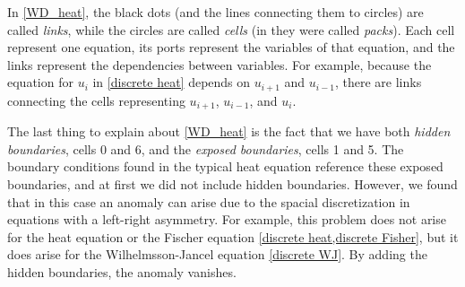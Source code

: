 \documentclass[11pt]{article}
\begin{document}
\begin{figure*}
\caption{Wiring diagram for the discrete heat equation with n = 7 partitions. The boundary conditions in this instance are cells 1 and 5, but the product is evaluated as if 0 and 6 were boundaries to help prevent discontinuities at the true boundary.}
\label{WD_heat}
\begin{center}
\end{center}
\end{figure*}

In \cref{WD_heat}, the black dots (and the lines connecting them to circles) are called \textit{links}, while the circles are called \textit{cells} (in \citep{Introduction_to_PA} they were called \textit{packs}). Each cell represent one equation, its ports represent the variables of that equation, and the links represent the dependencies between variables. For example, because the equation for $u_i$ in \cref{discrete heat} depends on $u_{i+1}$ and $u_{i-1}$, there are links connecting the cells representing $u_{i+1}$, $u_{i-1}$, and $u_i$.

The last thing to explain about \cref{WD_heat} is the fact that we have both \emph{hidden boundaries}, cells 0 and 6, and the \emph{exposed boundaries}, cells 1 and 5. The boundary conditions found in the typical heat equation reference these exposed boundaries, and at first we did not include hidden boundaries. However, we found that in this case an anomaly can arise due to the spacial discretization in equations with a left-right asymmetry. For example, this problem does not arise for the heat equation or the Fischer equation \cref{discrete heat,discrete Fisher}, but it does arise for the Wilhelmsson-Jancel equation \cref{discrete WJ}. By adding the hidden boundaries, the anomaly vanishes.
\end{document}
